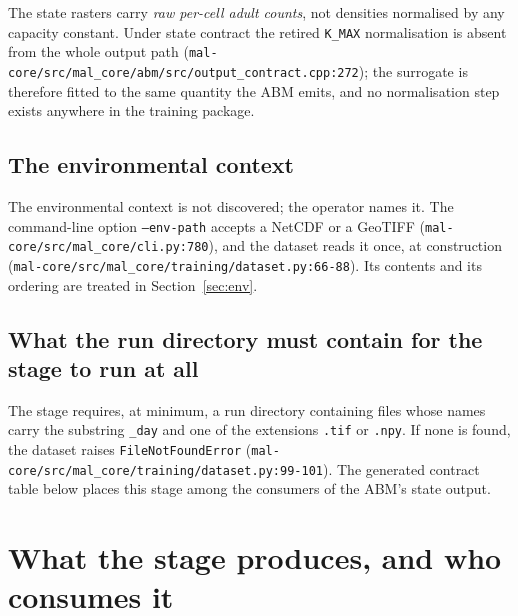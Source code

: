 \documentclass[11pt,a4paper]{article}
\newcommand{\codex}[1]{\texttt{#1}}
\newcommand{\StateContract}{\mskey{contracts.cogs_state}}
\begin{document}
The state rasters carry \emph{raw per-cell adult counts}, not densities
normalised by any capacity constant. Under state contract \StateContract the
retired \codex{K\_\allowbreak{}MAX} normalisation is absent from the whole output path
(\codex{mal-core/\allowbreak{}src/\allowbreak{}mal\_\allowbreak{}core/\allowbreak{}abm/\allowbreak{}src/\allowbreak{}output\_\allowbreak{}contract.cpp:272}); the surrogate
is therefore fitted to the same quantity the ABM emits, and no normalisation
step exists anywhere in the training package.

\subsection{The environmental context}

The environmental context is not discovered; the operator names it. The
command-line option \codex{--env-path} accepts a NetCDF or a GeoTIFF
(\codex{mal-core/\allowbreak{}src/\allowbreak{}mal\_\allowbreak{}core/\allowbreak{}cli.py:780}), and the dataset reads it once, at
construction (\codex{mal-core/\allowbreak{}src/\allowbreak{}mal\_\allowbreak{}core/\allowbreak{}training/\allowbreak{}dataset.py:66-88}). Its
contents and its ordering are treated in Section~\ref{sec:env}.

\subsection{What the run directory must contain for the stage to run at all}

The stage requires, at minimum, a run directory containing files whose names
carry the substring \codex{\_\allowbreak{}day} and one of the extensions \codex{.tif} or
\codex{.npy}. If none is found, the dataset raises
\codex{FileNotFoundError} (\codex{mal-core/\allowbreak{}src/\allowbreak{}mal\_\allowbreak{}core/\allowbreak{}training/\allowbreak{}dataset.py:99-101}).
The generated contract table below places this stage among the consumers of
the ABM's state output.

\begin{landscape}
{\tiny\setlength{\tabcolsep}{3pt}\setlength{\LTleft}{0pt}\setlength{\LTright}{0pt}%
}
\end{landscape}

\section{What the stage produces, and who consumes it}
\label{sec:produces}
\end{document}
